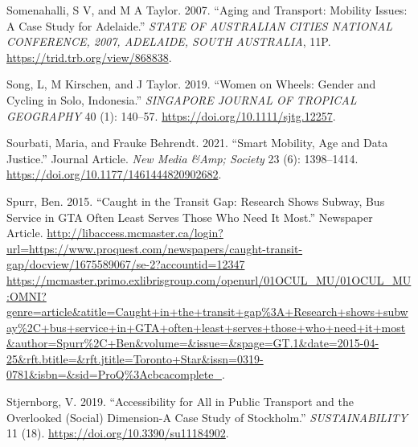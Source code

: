 \documentclass[12pt, oneside]{report}
\newlength{\cslhangindent}
\newlength{\cslentryspacingunit} %
\newenvironment{CSLReferences}[2] %
 {%
  \setlength{\parindent}{0pt}
  \ifodd #1
  \let\oldpar\par
  \def\par{\hangindent=\cslhangindent\oldpar}
  \fi
  \setlength{\parskip}{#2\cslentryspacingunit}
 }%
 {}
\begin{document}
\begin{CSLReferences}{1}{0}
\leavevmode{}%
Somenahalli, S V, and M A Taylor. 2007. {``Aging and Transport: Mobility
Issues: A Case Study for Adelaide.''} \emph{{STATE} {OF} {AUSTRALIAN}
{CITIES} {NATIONAL} {CONFERENCE}, 2007, {ADELAIDE}, {SOUTH}
{AUSTRALIA}}, 11P. \url{https://trid.trb.org/view/868838}.

\leavevmode{}%
Song, L, M Kirschen, and J Taylor. 2019. {``Women on Wheels: {Gender}
and Cycling in {Solo}, {Indonesia}.''} \emph{SINGAPORE JOURNAL OF
TROPICAL GEOGRAPHY} 40 (1): 140--57.
\url{https://doi.org/10.1111/sjtg.12257}.

\leavevmode{}%
Sourbati, Maria, and Frauke Behrendt. 2021. {``Smart Mobility, Age and
Data Justice.''} Journal Article. \emph{New Media \&Amp; Society} 23
(6): 1398--1414. \url{https://doi.org/10.1177/1461444820902682}.

\leavevmode{}%
Spurr, Ben. 2015. {``Caught in the Transit Gap: Research Shows Subway,
Bus Service in GTA Often Least Serves Those Who Need It Most.''}
Newspaper Article.
\href{http://libaccess.mcmaster.ca/login?url=https://www.proquest.com/newspapers/caught-transit-gap/docview/1675589067/se-2?accountid=12347\%0Ahttps://mcmaster.primo.exlibrisgroup.com/openurl/01OCUL_MU/01OCUL_MU:OMNI?genre=article\&atitle=Caught+in+the+transit+gap\%3A+Research+shows+subway\%2C+bus+service+in+GTA+often+least+serves+those+who+need+it+most\&author=Spurr\%2C+Ben\&volume=\&issue=\&spage=GT.1\&date=2015-04-25\&rft.btitle=\&rft.jtitle=Toronto+Star\&issn=0319-0781\&isbn=\&sid=ProQ\%3Acbcacomplete_}{http://libaccess.mcmaster.ca/login?url=https://www.proquest.com/newspapers/caught-transit-gap/docview/1675589067/se-2?accountid=12347
https://mcmaster.primo.exlibrisgroup.com/openurl/01OCUL\_MU/01OCUL\_MU:OMNI?genre=article\&atitle=Caught+in+the+transit+gap\%3A+Research+shows+subway\%2C+bus+service+in+GTA+often+least+serves+those+who+need+it+most\&author=Spurr\%2C+Ben\&volume=\&issue=\&spage=GT.1\&date=2015-04-25\&rft.btitle=\&rft.jtitle=Toronto+Star\&issn=0319-0781\&isbn=\&sid=ProQ\%3Acbcacomplete\_}.

\leavevmode{}%
Stjernborg, V. 2019. {``Accessibility for {All} in {Public Transport}
and the {Overlooked} ({Social}) {Dimension-A Case Study} of
{Stockholm}.''} \emph{SUSTAINABILITY} 11 (18).
\url{https://doi.org/10.3390/su11184902}.


\end{CSLReferences}
\end{document}
